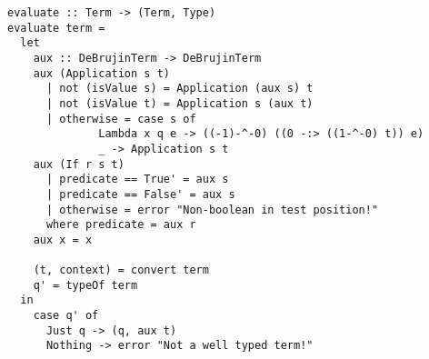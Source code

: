 \documentclass[11pt]{article}
\begin{document}
\begin{verbatim}
evaluate :: Term -> (Term, Type)
evaluate term =
  let
    aux :: DeBrujinTerm -> DeBrujinTerm
    aux (Application s t)
      | not (isValue s) = Application (aux s) t
      | not (isValue t) = Application s (aux t)
      | otherwise = case s of
		      Lambda x q e -> ((-1)-^-0) ((0 -:> ((1-^-0) t)) e)
		      _ -> Application s t
    aux (If r s t)
      | predicate == True' = aux s
      | predicate == False' = aux s
      | otherwise = error "Non-boolean in test position!"
      where predicate = aux r
    aux x = x

    (t, context) = convert term
    q' = typeOf term
  in
    case q' of
      Just q -> (q, aux t)
      Nothing -> error "Not a well typed term!"
\end{verbatim}
\end{document}
